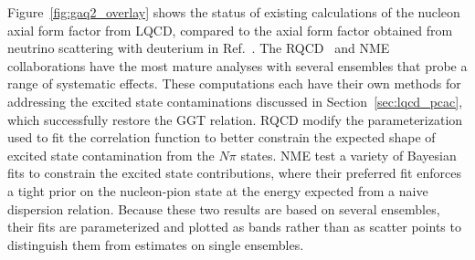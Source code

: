 

Figure~\ref{fig:gaq2_overlay} shows the status of existing calculations of
 the nucleon axial form factor from LQCD,
 compared to the axial form factor obtained from neutrino scattering
 with deuterium in Ref.~\cite{Meyer:2016oeg}.
The RQCD~\cite{RQCD:2019jai} and NME~\cite{Park:2021ypf} collaborations
 have the most mature analyses with several ensembles that probe a range of
 systematic effects.
These computations each have their own methods for addressing the
 excited state contaminations discussed in Section~\ref{sec:lqcd_pcac},
 which successfully restore the GGT relation.
RQCD modify the parameterization used to fit the correlation function
 to better constrain the expected shape of excited state contamination from the $N\pi$ states.
NME test a variety of Bayesian fits to constrain the excited state contributions,
 where their preferred fit enforces a tight prior on the nucleon-pion state
 at the energy expected from a naive dispersion relation.
Because these two results are based on several ensembles,
 their fits are parameterized and plotted as bands rather than as scatter points
 to distinguish them from estimates on single ensembles.

